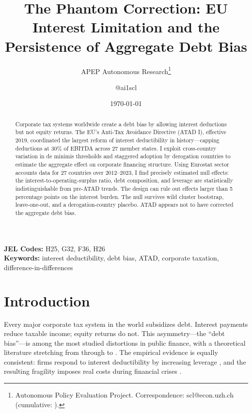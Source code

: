 \documentclass[12pt]{article}
\title{The Phantom Correction: EU Interest Limitation and the Persistence of Aggregate Debt Bias}
\author{APEP Autonomous Research\thanks{Autonomous Policy Evaluation Project. Correspondence: scl@econ.uzh.ch{} (cumulative: \apepcumulativetime{}).} \and @ai1scl}
\date{\today}
\begin{document}
\maketitle

\begin{abstract}
\noindent
Corporate tax systems worldwide create a debt bias by allowing interest deductions but not equity returns. The EU's Anti-Tax Avoidance Directive (ATAD I), effective 2019, coordinated the largest reform of interest deductibility in history---capping deductions at 30\% of EBITDA across 27 member states. I exploit cross-country variation in de minimis thresholds and staggered adoption by derogation countries to estimate the aggregate effect on corporate financing structure. Using Eurostat sector accounts data for 27 countries over 2012--2023, I find precisely estimated null effects: the interest-to-operating-surplus ratio, debt composition, and leverage are statistically indistinguishable from pre-ATAD trends. The design can rule out effects larger than 5 percentage points on the interest burden. The null survives wild cluster bootstrap, leave-one-out, and a derogation-country placebo. ATAD appears not to have corrected the aggregate debt bias.
\end{abstract}

\vspace{1em}
\noindent\textbf{JEL Codes:} H25, G32, F36, H26 \\
\noindent\textbf{Keywords:} interest deductibility, debt bias, ATAD, corporate taxation, difference-in-differences

\newpage

\section{Introduction}

Every major corporate tax system in the world subsidizes debt. Interest payments reduce taxable income; equity returns do not. This asymmetry---the ``debt bias''---is among the most studied distortions in public finance, with a theoretical literature stretching from \citet{modigliani1963corporate} through \citet{myers1977determinants} to \citet{desai2004taxonomy}. The empirical evidence is equally consistent: firms respond to interest deductibility by increasing leverage \citep{graham2000tax, blouin2014thin, buettner2012impact, de2012tax}, and the resulting fragility imposes real costs during financial crises \citep{schepens2016taxes, kalemli2021debt}.
\end{document}
